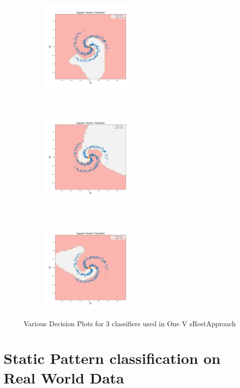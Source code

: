 \begin{figure}[!ht]
    \centering
    \begin{subfigure}[t]{0.33\textwidth}
        \centering
        \includegraphics[height=1.75in]{Dataset_1b/SVM/test4.png}
    \end{subfigure}%
    ~ 
    \begin{subfigure}[t]{0.33\textwidth}
        \centering
        \includegraphics[height=1.75in]{Dataset_1b/SVM/test5.png}
    \end{subfigure}%
    ~
    \begin{subfigure}[t]{0.33\textwidth}
        \centering
        \includegraphics[height=1.75in]{Dataset_1b/SVM/test6.png}
    \end{subfigure}%
    \caption{Various Decision Plots for 3 classifiers used in One V sRestApproach}
    \label{fig:13}
\end{figure}

\newpage
\section{Static Pattern classification on Real World Data}

